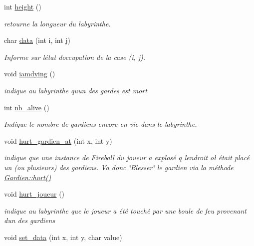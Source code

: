 \begin{DoxyCompactItemize}
int \hyperlink{classLabyrinthe_a71d545c9606ad5e8bf840293f22e552b}{height} ()
\begin{DoxyCompactList}\small\item\em retourne la longueur du labyrinthe. \end{DoxyCompactList}\item 
char \hyperlink{classLabyrinthe_a433936ae60ddf3f0b85a407f414b8d38}{data} (int i, int j)
\begin{DoxyCompactList}\small\item\em Informe sur l\textquotesingle{}état d\textquotesingle{}occupation de la case (i, j). \end{DoxyCompactList}\item 
void \hyperlink{classLabyrinthe_a987dc5663797cae6f75853e24a9f3ffb}{iamdying} ()
\begin{DoxyCompactList}\small\item\em indique au labyrinthe qu\textquotesingle{}un des gardes est mort \end{DoxyCompactList}\item 
int \hyperlink{classLabyrinthe_ab13197de5f094c67422e558c2347dbe8}{nb\+\_\+alive} ()
\begin{DoxyCompactList}\small\item\em Indique le nombre de gardiens encore en vie dans le labyrinthe. \end{DoxyCompactList}\item 
void \hyperlink{classLabyrinthe_a9c7c46b8c376f8b9ab0310ae1d0a369c}{hurt\+\_\+gardien\+\_\+at} (int x, int y)
\begin{DoxyCompactList}\small\item\em indique que une instance de Fireball du joueur a explosé ą l\textquotesingle{}endroit oł était placé un (ou plusieurs) des gardiens. Va donc \char`\"{}\+Blesser\char`\"{} le gardien via la méthode \hyperlink{classGardien_ac4ba490e309de80c1449fc5baef90390}{Gardien\+::hurt()} \end{DoxyCompactList}\item 
void \hyperlink{classLabyrinthe_a28666f6cd5a5f32d41d664204a717593}{hurt\+\_\+joueur} ()
\begin{DoxyCompactList}\small\item\em indique au labyrinthe que le joueur a été touché par une boule de feu provenant d\textquotesingle{}un des gardiens \end{DoxyCompactList}\item 
void \hyperlink{classLabyrinthe_acc7682cd69ca12f27cb65457c9c8e89b}{set\+\_\+data} (int x, int y, char value)

\end{DoxyCompactItemize}
